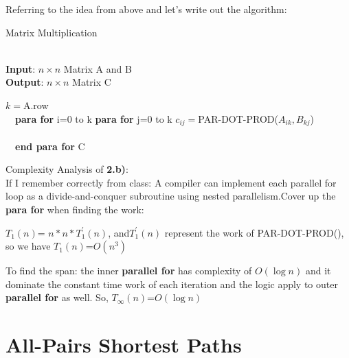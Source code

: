 \documentclass{article}
\begin{document}
\begin{enumerate}[(a)]
Referring to the idea from above and let's write out the algorithm:
\algrenewcommand\textproc{}
\begin{algorithm}
\renewcommand{\thealgorithm}{2.b):}
\caption{Matrix Multiplication}\\
\textbf{Input}: $n\times n$ Matrix A and B \\
\textbf{Output}: $n\times n$ Matrix C
\begin{algorithmic}[1]
\State $k= $A.row  \\
\   \ \textbf{para for} i=0 to k 
\State\textbf{para for} j=0 to k 
\State $c_{ij}=$PAR-DOT-PROD($A_{ik},B_{kj}$) \\
 \\
\ \ \textbf{end para for}
\State\Return C
\EndFunction
\end{algorithmic}
\end{algorithm}
\newpage
Complexity Analysis of \textbf{2.b)}: \\
If I remember correctly from class:
A compiler can implement each parallel for loop as a divide-and-conquer subroutine using nested parallelism.Cover up the \textbf{para for} when finding the work:

$T_{1}(n)$= $n*n*T^{'}_1(n)$, and$ T^{'}_1(n)$ represent the work of PAR-DOT-PROD(), so we have $T_{1}(n)$=$O(n^3)$

To find the span: the inner \textbf{parallel for} has complexity of 
$O(\log n)$ and it dominate the constant time work of each iteration and the logic apply to outer \textbf{parallel for} as well. So,
$T_{\infty}(n)$=$O(\log{n})$



\end{enumerate}
\section{All-Pairs Shortest Paths}
\end{document}
